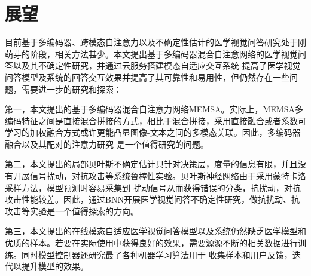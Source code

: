 \section*{展望}
目前基于多编码器、跨模态自注意力以及不确定性估计的医学视觉问答研究处于刚萌芽的阶段，相关方法甚少。本文提出基于多编码器混合自注意网络的医学视觉问答以及其不确定性研究，并通过云服务搭建模态自适应交互系统
提高了医学视觉问答模型及系统的回答交互效果并提高了其可靠性和易用性，但仍然存在一些问题，需要进一步的研究和探索：

第一，本文提出的基于多编码器混合自注意力网络MEMSA。实际上，MEMSA多编码特征之间是直接混合拼接的方式，相比于混合拼接，采用直接融合或者系数可学习的加权融合方式或许更能凸显图像-文本之间的多模态关联。因此，多编码器融合以及其配对的注意力研究
是一个值得研究的问题。

第二，本文提出的局部贝叶斯不确定估计只针对决策层，度量的信息有限，并且没有开展信号扰动，对抗攻击等系统鲁棒性实验。贝叶斯神经网络由于采用蒙特卡洛采样方法，模型预测时容易采集到
扰动信号从而获得错误的分类，抗扰动，对抗攻击性能较差。因此，通过BNN开展医学视觉问答不确定性研究，做抗扰动、抗攻击等实验是一个值得探索的方向。

第三，本文提出的在线模态自适应医学视觉问答模型以及系统仍然缺乏医学模型和优质的样本。若要在实际使用中获得良好的效果，需要源源不断的相关数据进行训练。同时模型控制器还研究最了各种机器学习算法用于
收集样本和用户反馈，迭代以提升模型的效果。